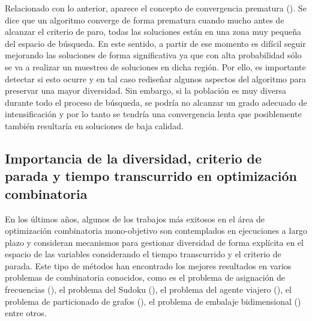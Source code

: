 Relacionado con lo anterior, aparece el concepto de convergencia prematura (\cite{Crepinsek:13}).
%
Se dice que un algoritmo converge de forma prematura cuando mucho antes de alcanzar el criterio de paro, todas las soluciones están en una zona muy pequeña del espacio de búsqueda.
%
En este sentido, a partir de ese momento es difícil seguir mejorando las soluciones de forma significativa ya que con alta probabilidad sólo se va a realizar un muestreo de soluciones en dicha región.
%
Por ello, es importante detectar si esto ocurre y en tal caso rediseñar algunos aspectos del algoritmo para preservar una mayor diversidad.
%
Sin embargo, si la población es muy diversa durante todo el proceso de búsqueda, se podría no alcanzar un grado adecuado de intensificación y por lo tanto se tendría una convergencia lenta que posiblemente también resultaría en soluciones de baja calidad.

\subsection{Importancia de la diversidad, criterio de parada y tiempo transcurrido en optimización combinatoria}

En los últimos años, algunos de los trabajos más exitosos en el área de optimización combinatoria mono-objetivo son contemplados en ejecuciones a largo plazo y consideran mecanismos para gestionar diversidad de forma explícita en el espacio de las variables considerando el tiempo transcurrido y el criterio de parada.
%
Este tipo de métodos han encontrado los mejores resultados en varios problemas de combinatoria conocidos, como es el problema de asignación de frecuencias  (\cite{Joel:Dynamic_FAP}), el problema del Sudoku  (\cite{Joel:Dynamic_Sudoku}), el problema del agente viajero  (\cite{Joel:ANovelDiversityBasedEAForTheTSP}), el problema de particionado de grafos  (\cite{romero2018memetic}), el problema de embalaje bidimensional  (\cite{segredo2014memetic})  entre otros.

%
%
%


